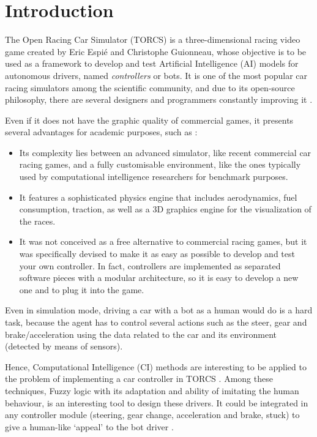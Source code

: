 \documentclass[runningheads,a4paper]{llncs}
\begin{document}
	\section{Introduction}
	\label{sec:intro}
	
	The Open Racing Car Simulator (TORCS) \cite{WebTORCS} is a
	three-dimensional racing video game created by Eric Espi\'e and
	Christophe Guionneau, whose objective  is to be used as a
	framework to develop and test Artificial Intelligence (AI) models for
	autonomous drivers, named \textit{controllers} or bots. It is
	one of the most popular car racing simulators among the scientific
	community, and due to its open-source philosophy, there are
	several designers and programmers constantly improving it
	\cite{manualTORCS}. 
	
	
	Even if it does not have the graphic quality of commercial games, it
	presents several advantages for academic purposes, such as
	\cite{manualTORCS}: 
	
	\begin{itemize}
		\item  Its complexity lies between an advanced simulator, like recent commercial
		car racing games, and a fully customisable environment,
		like the ones typically used by computational
		intelligence researchers for benchmark purposes.
		\item  It features a sophisticated physics engine  that
		includes aerodynamics,
		fuel consumption, traction, as well as a 3D graphics
		engine for the visualization of the races.
		\item  It was not conceived as a free alternative to commercial
		racing games, but it was specifically devised to make it
		as easy as possible to develop and test your own controller. 
		In fact, controllers are implemented as separated software pieces with a 		 
		modular architecture, so it is easy to develop a new one and to plug 
		it into the game.
	\end{itemize}
	
	Even in simulation mode, driving a car with a bot as a human would do
	is a hard task, because the agent has to control several actions such
	as the steer, gear and brake/acceleration using the data related to
	the car and its environment (detected by means of sensors). 
	
	Hence, Computational Intelligence (CI) methods are interesting to be applied to the problem of implementing a car controller in TORCS \cite{Quadflieg_LearningTrack,CardamoneImitation09,MunozHumanLike10,Cardamone_Online_NN}. Among these techniques, Fuzzy logic \cite{abraham2001} with its adaptation and ability of imitating the human behaviour, is an interesting tool to design these drivers. It could be integrated in any controller module (steering, gear change, acceleration and brake, stuck) to give a human-like `appeal' to the bot driver \cite{CarRacing_Pelta09,torcs2012}.  
	
\end{document}
